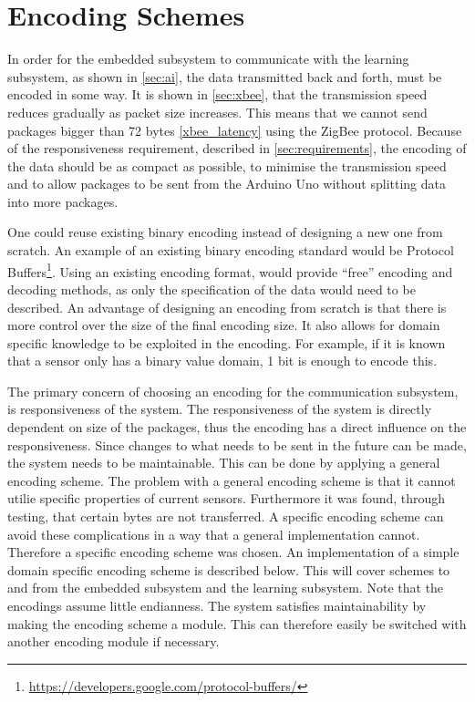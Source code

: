 \section{Encoding Schemes}
\label{sec:encoding}
In order for the embedded subsystem to communicate with the learning subsystem, as shown in \cref{sec:ai}, the data transmitted back and forth, must be encoded in some way. It is shown in \cref{sec:xbee}, that the transmission speed reduces gradually as packet size increases. This means that we cannot send packages bigger than 72 bytes \cref{xbee_latency} using the ZigBee protocol. Because of the responsiveness requirement, described in \cref{sec:requirements}, the encoding of the data should be as compact as possible, to minimise the transmission speed and to allow packages to be sent from the Arduino Uno without splitting data into more packages.

One could reuse existing binary encoding instead of designing a new one from scratch. An example of an existing binary encoding standard would be Protocol Buffers\footnote{\url{https://developers.google.com/protocol-buffers/}}. Using an existing encoding format, would provide \enquote{free} encoding and decoding methods, as only the specification of the data would need to be described. An advantage of designing an encoding from scratch is that there is more control over the size of the final encoding size. It also allows for domain specific knowledge to be exploited in the encoding. For example, if it is known that a sensor only has a binary value domain, 1 bit is enough to encode this.

The primary concern of choosing an encoding for the communication subsystem, is responsiveness of the system.
The responsiveness of the system is directly dependent on size of the packages, thus the encoding has a direct influence on the responsiveness. Since changes to what needs to be sent in the future can be made, the system needs to be maintainable. This can be done by applying a general encoding scheme. The problem with a general encoding scheme is that it cannot utilie specific properties of current sensors. Furthermore it was found, through testing, that certain bytes are not transferred. A specific encoding scheme can avoid these complications in a way that a general implementation cannot. Therefore a specific encoding scheme was chosen. An implementation of a simple domain specific encoding scheme is described below. This will cover schemes to and from the embedded subsystem and the learning subsystem. Note that the encodings assume little endianness. The system satisfies maintainability by making the encoding scheme a module. This can therefore easily be switched with another encoding module if necessary.

